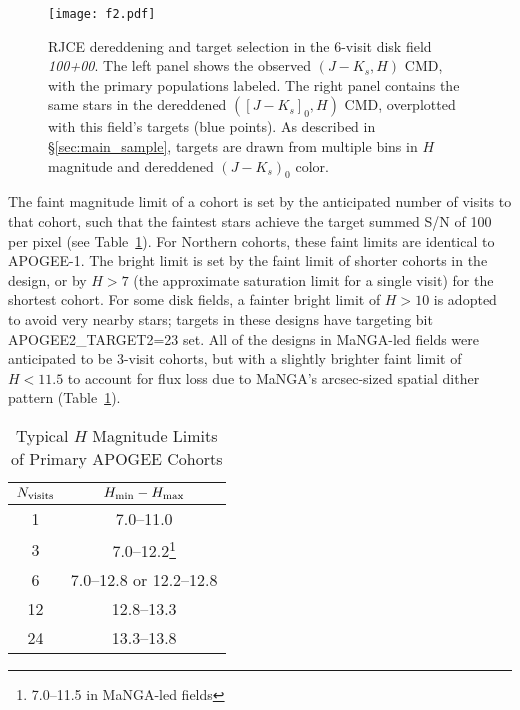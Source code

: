 \documentclass[12pt,twocolumn]{emulateapj}
\begin{document}
\begin{figure*}[!hptb]
\begin{center}
\texttt{[image: f2.pdf]} %
\caption{RJCE dereddening and target selection in the 6-visit disk field {\it 100+00}.  The left panel shows the observed $(J-K_s, H)$ CMD, with the primary populations labeled.  The right panel contains the same stars in the dereddened $([J-K_s]_0,H)$ CMD, overplotted with this field's targets (blue points).  As described in \S\ref{sec:main_sample}, targets are drawn from multiple bins in $H$ magnitude and dereddened $(J-K_s)_0$ color. 
}
\label{fig:diskcmd}
\end{center}
\end{figure*}


The faint magnitude limit of a cohort is set by the anticipated number of visits to that cohort, 
such that the faintest stars achieve the target summed S/N of 100 per pixel (see Table~\ref{tab:cohort_mag_limits}).
For Northern cohorts, these faint limits are identical to APOGEE-1.
The bright limit is set by the faint limit of shorter cohorts in the design, or by $H>7$ (the approximate saturation limit for a single visit) for the shortest cohort.  For some disk fields, a fainter bright limit of $H>10$ is adopted to avoid very nearby stars; targets in these designs have targeting bit APOGEE2\_TARGET2=23 set.
All of the designs in MaNGA-led fields were anticipated to be 3-visit cohorts, 
but with a slightly brighter faint limit of $H<11.5$ to account for
flux loss due to MaNGA's arcsec-sized spatial dither pattern (Table~\ref{tab:cohort_mag_limits}).

\begin{table}[hpbt]
  \begin{center}
  \caption{Typical $H$ Magnitude Limits of Primary APOGEE Cohorts}
  \begin{tabular}{c c}
$N_{\rm visits}$ & $H_{\rm min}-H_{\rm max}$ \\
  \hline
1 & 7.0--11.0 \\
3 & 7.0--12.2\footnote{7.0--11.5 in MaNGA-led fields} \\
6 & 7.0--12.8 or 12.2--12.8 \\
12 & 12.8--13.3 \\
24 & 13.3--13.8 \\
  \end{tabular}
  \label{tab:cohort_mag_limits}
  \end{center}
\end{table}
\end{document}
